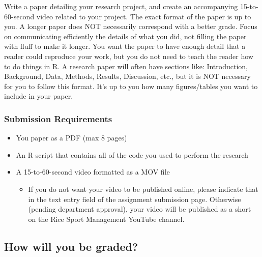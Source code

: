 \documentclass{article}
\begin{document}
      Write a paper detailing your research project, and create an accompanying 15-to-60-second video related to your project. The exact format of the paper is up to you. A longer paper does NOT necessarily correspond with a better grade. Focus on communicating efficiently the details of what you did, not filling the paper with fluff to make it longer. You want the paper to have enough detail that a reader could reproduce your work, but you do not need to teach the reader how to do things in R. A research paper will often have sections like: Introduction, Background, Data, Methods, Results, Discussion, etc., but it is NOT necessary for you to follow this format. It's up to you how many figures/tables you want to include in your paper.
  
      \subsubsection*{\sc Submission Requirements}

        \begin{itemize}
          \item You paper as a PDF (max 8 pages)
          \item An R script that contains all of the code you used to perform the research
          \item A 15-to-60-second video formatted as a MOV file
          \begin{itemize}
            \item If you do not want your video to be published online, please indicate that in the text entry field of the assignment submission page. Otherwise (pending department approval), your video will be published as a short on the Rice Sport Management YouTube channel.
          \end{itemize}
        \end{itemize}
   
    \subsection*{\sc How will you be graded?}
 
\end{document}
